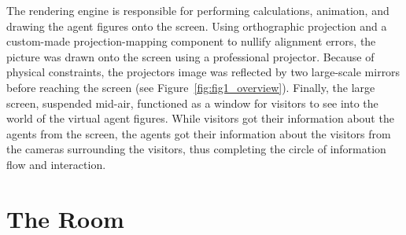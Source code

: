 \documentclass[draft,final]{vutinfth} %
\begin{document}
The rendering engine is responsible for performing calculations, animation, and drawing the \glspl{agent figure} onto the screen. 
Using orthographic projection and a custom-made projection-mapping component to nullify alignment errors, the picture was drawn onto the screen using a professional projector. 
Because of physical constraints, the projectors image was reflected by two large-scale mirrors before reaching the screen (see Figure~\ref{fig:fig1_overview}). 
Finally, the large screen, suspended mid-air, functioned as a window for \glspl{visitor} to see into the world of the virtual \glspl{agent figure}. 
While \glspl{visitor} got their information about the agents from the screen, the agents got their information about the \glspl{visitor} from the cameras surrounding the \glspl{visitor}, thus completing the circle of information flow and interaction.

\section{The Room}
\label{chap:theroom}
\end{document}
